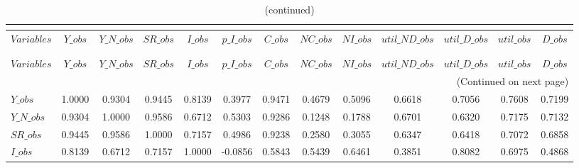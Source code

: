  
\begin{center}
\begin{longtable}{lcccccccccccc} 
\caption{MATRIX OF CORRELATIONS}\\
 \label{Table:th_corr_matrix}\\
\toprule 
$Variables      $	 & 	 $          Y\_obs$	 & 	 $      Y\_N\_obs$	 & 	 $         SR\_obs$	 & 	 $          I\_obs$	 & 	 $      p\_I\_obs$	 & 	 $          C\_obs$	 & 	 $         NC\_obs$	 & 	 $         NI\_obs$	 & 	 $  util\_ND\_obs$	 & 	 $   util\_D\_obs$	 & 	 $       util\_obs$	 & 	 $          D\_obs$\\
\midrule \endfirsthead 
\caption{(continued)}\\
 \toprule \\ 
$Variables      $	 & 	 $          Y\_obs$	 & 	 $      Y\_N\_obs$	 & 	 $         SR\_obs$	 & 	 $          I\_obs$	 & 	 $      p\_I\_obs$	 & 	 $          C\_obs$	 & 	 $         NC\_obs$	 & 	 $         NI\_obs$	 & 	 $  util\_ND\_obs$	 & 	 $   util\_D\_obs$	 & 	 $       util\_obs$	 & 	 $          D\_obs$\\
\midrule \endhead 
\midrule \multicolumn{13}{r}{(Continued on next page)} \\ \bottomrule \endfoot 
\bottomrule \endlastfoot 
$Y\_obs         $	 & 	           1.0000	 & 	           0.9304	 & 	           0.9445	 & 	           0.8139	 & 	           0.3977	 & 	           0.9471	 & 	           0.4679	 & 	           0.5096	 & 	           0.6618	 & 	           0.7056	 & 	           0.7608	 & 	           0.7199 \\ 
$Y\_N\_obs      $	 & 	           0.9304	 & 	           1.0000	 & 	           0.9586	 & 	           0.6712	 & 	           0.5303	 & 	           0.9286	 & 	           0.1248	 & 	           0.1788	 & 	           0.6701	 & 	           0.6320	 & 	           0.7175	 & 	           0.7132 \\ 
$SR\_obs        $	 & 	           0.9445	 & 	           0.9586	 & 	           1.0000	 & 	           0.7157	 & 	           0.4986	 & 	           0.9238	 & 	           0.2580	 & 	           0.3055	 & 	           0.6347	 & 	           0.6418	 & 	           0.7072	 & 	           0.6858 \\ 
$I\_obs         $	 & 	           0.8139	 & 	           0.6712	 & 	           0.7157	 & 	           1.0000	 & 	          -0.0856	 & 	           0.5843	 & 	           0.5439	 & 	           0.6461	 & 	           0.3851	 & 	           0.8082	 & 	           0.6975	 & 	           0.4868 \\ 

\end{longtable}
\end{center}
